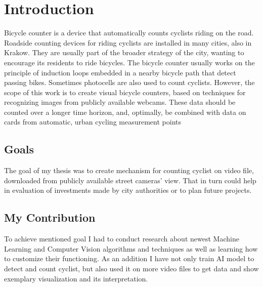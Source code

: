 \chapter{Introduction}
\label{cha:introduction}

Bicycle counter is a device that automatically counts cyclists riding on the road. Roadside counting devices for riding cyclists are installed in many cities, also in Krakow. They are usually part of the broader strategy of the city, wanting to encourage its residents to ride bicycles. The bicycle counter usually works on the principle of induction loops embedded in a nearby bicycle path that detect passing bikes. Sometimes photocells are also used to count cyclists. However, the scope of this work is to create visual bicycle counters, based on techniques for recognizing images from publicly available webcams. These data should be counted over a longer time horizon, and, optimally, be combined with data on cards from automatic, urban cycling measurement points


\section{Goals}
\label{sec:goals}

The goal of my thesis was to create mechanism for counting cyclist on video file, downloaded from publicly available street cameras' view. That in turn could help in evaluation of investments made by city authorities or to plan future projects.



\section{My Contribution}
\label{sec:myContribution}

To achieve mentioned goal I had to conduct research about newest Machine Learning and Computer Vision algorithms and techniques as well as learning how to customize their functioning. As an addition I have not only train AI model to detect and count cyclist, but also used it on more video files to get data and show exemplary visualization and its interpretation.


